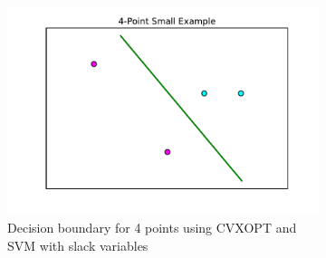 \documentclass[10pt]{article}
\begin{document}
\begin{figure}[!ht]
\centering
\begin{subfigure}[b]{0.46\textwidth}
	\centering
	\includegraphics[width=\textwidth]{exercise1-1.pdf}
	\caption{Decision boundary for 4 points using CVXOPT and SVM with slack variables}
	\label{fig:1-1}
\end{subfigure}
\caption{}
\label{fig:1-1-all}
\end{figure}
\end{document}
